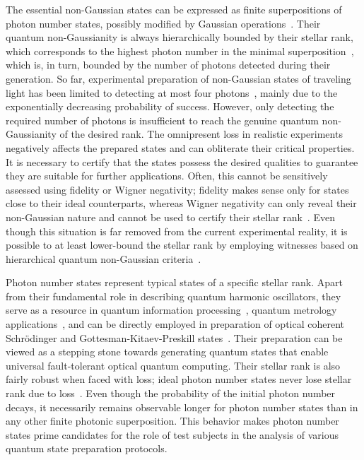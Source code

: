 \documentclass{optica-article}
\begin{document}
The essential non-Gaussian states can be expressed as finite superpositions of photon number states, possibly modified by Gaussian operations~\cite{lachman2019,fiurasek2022,walschaers2021,chabaud2020}. Their quantum non-Gaussianity is always hierarchically bounded by their stellar rank, which corresponds to the highest photon number in the minimal superposition~\cite{walschaers2021,lachman2019,fiurasek2022}, which is, in turn, bounded by the number of photons detected during their generation. So far, experimental preparation of non-Gaussian states of traveling light has been limited to detecting at most four photons~\cite{engelkemeier2021,endo2025b}, mainly due to the exponentially decreasing probability of success.
%
However, only detecting the required number of photons is insufficient to reach the genuine quantum non-Gaussianity of the desired rank. The omnipresent loss in realistic experiments negatively affects the prepared states and can obliterate their critical properties. It is necessary to certify that the states possess the desired qualities to guarantee they are suitable for further applications. Often, this cannot be sensitively assessed using fidelity or Wigner negativity; fidelity makes sense only for states close to their ideal counterparts, whereas Wigner negativity can only reveal their non-Gaussian nature and cannot be used to certify their stellar rank~\cite{walschaers2021}. Even though this situation is far removed from the current experimental reality, it is possible to at least lower-bound the stellar rank by employing witnesses based on hierarchical quantum non-Gaussian criteria~\cite{lachman2019,fiurasek2022}.

Photon number states represent typical states of a specific stellar rank. Apart from their fundamental role in describing quantum harmonic oscillators, they serve as a resource in quantum information processing~\cite{marek2009}, quantum metrology applications~\cite{oh2020,hanamura2023}, and can be directly employed in preparation of optical coherent Schr\"{o}dinger and Gottesman-Kitaev-Preskill states~\cite{winnel2024}. Their preparation can be viewed as a stepping stone towards generating quantum states that enable universal fault-tolerant optical quantum computing. Their stellar rank is also fairly robust when faced with loss; ideal photon number states never lose stellar rank due to loss~\cite{lachman2019}. Even though the probability of the initial photon number decays, it necessarily remains observable longer for photon number states than in any other finite photonic superposition. This behavior makes photon number states prime candidates for the role of test subjects in the analysis of various quantum state preparation protocols.
\end{document}
